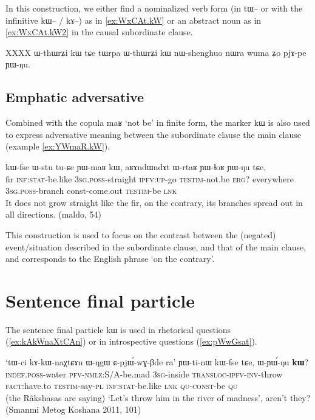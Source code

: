 \documentclass[oldfontcommands,oneside,a4paper,11pt]{article}
\newcommand{\ipa}[1]{{\phon #1}} %
\begin{document}
In this construction, we either find a nominalized verb form (in \ipa{tɯ--} or with the infinitive \ipa{kɯ--} / \ipa{kɤ--}) as in \ref{ex:WxCAt.kW} or an abstract noun as in \ref{ex:WxCAt.kW2} in the causal subordinate clause.

XXXX
\ipa{ɯ-thɯrʑi kɯ}
tɕe tɯrpa ɯ-thɯrʑi kɯ nɯ-shenghuo nɯra wuma ʑo pjɤ-pe ɲɯ-ŋu.
 \subsection{Emphatic adversative} \label{sec:advers}
Combined with the copula \ipa{maʁ} `not be' in finite form, the marker \ipa{kɯ} is also used to express adversative meaning between the subordinate clause the main clause (example \ref{ex:YWmaR.kW}).
 
  \begin{exe} 
 \ex \label{ex:YWmaR.kW}
\gll \ipa{tɯrgi} 	\ipa{kɯ-fse} 	\ipa{ɯ-stu} 	\ipa{tu-ɕe} 	\ipa{ɲɯ-maʁ} 	\ipa{kɯ,} \ipa{aʁɤndɯndɤt} 	\ipa{ɯ-rtaʁ} 	\ipa{ɲɯ-ɬoʁ} 	\ipa{ɲɯ-ŋu} 	\ipa{tɕe,} 
\\
fir \textsc{inf:stat}-be.like \textsc{3sg.poss}-straight \textsc{ipfv:up}-go \textsc{testim}-not.be \textsc{erg}? everywhere \textsc{3sg.poss}-branch const-come.out \textsc{testim}-be \textsc{lnk} \\ 
\glt It does not grow straight like the fir, on the contrary, its branches spread out in all directions. 
(maldo, 54)
 \end{exe}  
 
 This construction is used to focus on the contrast between the (negated) event/situation described in the subordinate clause, and that of the main clause, and corresponds to the English phrase `on the contrary'.
 
 \section{Sentence final particle} \label{sec:compl}
 
 
The sentence final particle \ipa{kɯ} is used in rhetorical questions (\ref{ex:kAkWnaXtCAn}) or in introspective questions (\ref{ex:pWwGsat}).
 \begin{exe} 
 \ex \label{ex:kAkWnaXtCAn}
\gll 
`\ipa{tɯ-ci} 	\ipa{kɤ-kɯ-naχtɕɤn} 	\ipa{ɯ-ŋgɯ} 	\ipa{ɕ-pjɯ́-wɣ-βde} 	\ipa{ra}' 	\ipa{ɲɯ-ti-nɯ} 	\ipa{kɯ-fse} 	\ipa{tɕe,} 	\ipa{ɯ-ɲɯ́-ŋu} 	\ipa{\textbf{kɯ}?} \\
\textsc{indef.poss}-water \textsc{pfv-nmlz}:S/A-be.mad \textsc{3sg}-inside \textsc{transloc-ipfv-inv}-throw \textsc{fact}:have.to \textsc{testim}-say-\textsc{pl} \textsc{inf:stat}-be.like \textsc{lnk} \textsc{qu-const}-be \textsc{qu} \\
\glt (the Râkshasas are saying)  `Let's throw him in the river of madness', aren't they? (Smanmi Metog Koshana 2011, 101)
\end{exe} 
 
\end{document}
